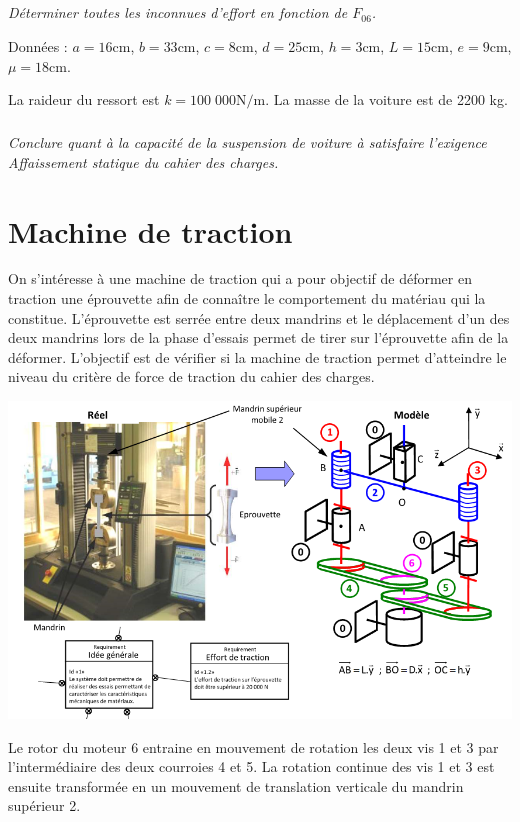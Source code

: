 \documentclass[10pt]{article}
\begin{document}
\subparagraph{}
\textit{Déterminer toutes les inconnues d'effort en fonction de $F_{06}$.}

Données : $a = 16 \text{cm}$, $b = 33 \text{cm}$, $c = 8 \text{cm}$, $d = 25 \text{cm}$, $h = 3 \text{cm}$, $L = 15 \text{cm}$, $e = 9 \text{cm}$, $\mu = 18 \text{cm}$. 

La raideur du ressort est $k = 100\;000 \text{N/m}$. La masse de la voiture est de 2200 kg.

\subparagraph{}
\textit{Conclure quant à la capacité de la suspension de voiture à satisfaire l’exigence Affaissement statique du cahier des charges. }


\section*{Machine de traction}

On s’intéresse à une machine de traction qui a pour objectif de déformer en traction une éprouvette afin de connaître le comportement du matériau qui la constitue. L'éprouvette est serrée entre deux mandrins et le déplacement d’un des deux mandrins lors de la phase d’essais permet de tirer sur l’éprouvette afin de la déformer. L'objectif est de vérifier si la machine de traction permet d'atteindre le niveau du critère de force de traction du cahier des charges. 


\begin{center}
\includegraphics[width=.9\linewidth]{images/traction}
\end{center}

Le rotor du moteur 6 entraine en mouvement de rotation les deux vis 1 et 3 par l’intermédiaire des deux courroies 4 et 5. La rotation continue des vis 1 et 3 est ensuite transformée en un mouvement de translation verticale du mandrin supérieur 2.   
\end{document}
